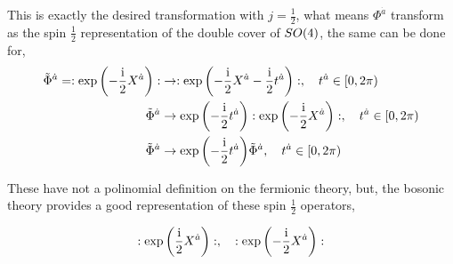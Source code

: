 This is exactly the desired transformation with $j=\frac12$, what means $\Phi^{\dot a}$ transform as the spin $\frac12$ representation 
of the double cover of $SO\qty(4)$, the same can be done for,
\begin{align*}
    {\tilde\Phi}^{\dot a}=:\exp\qty(-\frac{\textnormal{i}}2 X^{\dot a}):&\rightarrow:\exp\qty(-\frac{\textnormal{i}}2 X^{\dot a}-\frac{\textnormal{i}}2 t^{\dot a}):,\ \ \ t^{\dot a}\in[0,2\pi)\\
    {\tilde\Phi}^{\dot a}&\rightarrow\exp\qty(-\frac{\textnormal{i}}2 t^{\dot a}):\exp\qty(-\frac{\textnormal{i}}2 X^{\dot a}):,\ \ \ t^{\dot a}\in[0,2\pi)\\
    {\tilde\Phi}^{\dot a}&\rightarrow\exp\qty(-\frac{\textnormal{i}}2 t^{\dot a}){\tilde\Phi}^{\dot a},\ \ \ t^{\dot a}\in[0,2\pi)
\end{align*}

These have not a polinomial definition on the fermionic theory, but, the bosonic theory provides a good representation of these spin $\frac12$ operators,

\begin{align*}
    \cnord{\exp\qty(\frac\im2 X^{\dot a})},\ \ \ \cnord{\exp\qty(-\frac\im2 X^{\dot a})}
\end{align*}